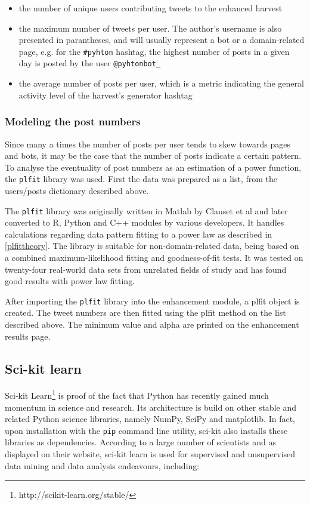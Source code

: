 \documentclass[12pt,a4paper,twoside]{report}
\begin{document}
\begin{itemize}
\item the number of unique users contributing tweets to the enhanced harvest
\item the maximum number of tweets per user. The author's username is also presented in parantheses, and will usually represent a bot or a domain-related page, e.g. for the \texttt{\#pyhton} hashtag, the highest number of posts in a given day is posted by the user \texttt{@pyhtonbot\_}
\item the average number of posts per user, which is a metric indicating the general activity level of the harvest's generator hashtag
\end{itemize}

\subsubsection{Modeling the post numbers}
Since many a times the number of posts per user tends to skew towards pages and bots, it may be the case that the number of posts indicate a certain pattern. To analyse the eventuality of post numbers as an estimation of a power function, the \texttt{plfit} library was used. First the data was prepared as a list, from the users/posts dictionary described above. 

The \texttt{plfit} library was originally written in Matlab by Clauset et al \cite{clauset2009power} and later converted to R, Python and C++ modules by various developers. It handles calculations regarding data pattern fitting to a power law as described in \ref{plfittheory}. The library is suitable for non-domain-related data, being based on a combined maximum-likelihood fitting and goodness-of-fit tests. It was tested on twenty-four real-world data sets from unrelated fields of study and has found good results with power law fitting.

After importing the \texttt{plfit} library into the enhancement module, a plfit object is created. The tweet numbers are then fitted using the plfit method on the list described above. The minimum value and alpha are printed on the enhancement results page.

\subsection{Sci-kit learn}
Sci-kit Learn\footnote{http://scikit-learn.org/stable/} is proof of the fact that Python has recently gained much momentum in science and research. Its architecture is build on other stable and related Python science libraries, namely NumPy, SciPy and matplotlib. In fact, upon installation with the \texttt{pip} command line utility, sci-kit also installs these libraries as dependencies. According to a large number of scientists \cite{pedregosa2011scikit} and as displayed on their website, sci-kit learn is used for supervised and unsupervised data mining and data analysis endeavours, including:
\end{document}
